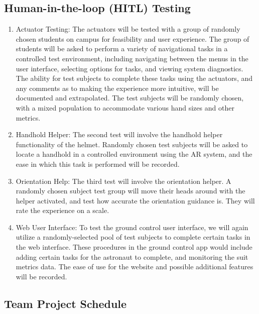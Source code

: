 \documentclass{article}
\let\Oldsubsection\subsection
\renewcommand{\subsection}{\FloatBarrier\Oldsubsection}
\begin{document}
\subsection{Human-in-the-loop (HITL) Testing}

\begin{enumerate}
\item Actuator Testing: The actuators will be tested with a group of randomly chosen students on campus for feasibility and user experience. The group of students will be asked to perform a variety of navigational tasks in a controlled test environment, including navigating between the menus in the user interface, selecting options for tasks, and viewing system diagnostics. The ability for test subjects to complete these tasks using the actuators, and any comments as to making the experience more intuitive, will be documented and extrapolated. The test subjects will be randomly chosen, with a mixed population to accommodate various hand sizes and other metrics.
\item Handhold Helper: The second test will involve the handhold helper functionality of the helmet. Randomly chosen test subjects will be asked to locate a handhold in a controlled environment using the AR system, and the ease in which this task is performed will be recorded.
\item Orientation Help: The third test will involve the orientation helper. A randomly chosen subject test group will move their heads around with the helper activated, and test how accurate the orientation guidance is. They will rate the experience on a scale.
\item Web User Interface: To test the ground control user interface, we will again utilize a randomly-selected pool of test subjects to complete certain tasks in the web interface. These procedures in the ground control app would include adding certain tasks for the astronaut to complete, and monitoring the suit metrics data. The ease of use for the website and possible additional features will be recorded.
\end{enumerate}

\subsection{Team Project Schedule}
\end{document}
